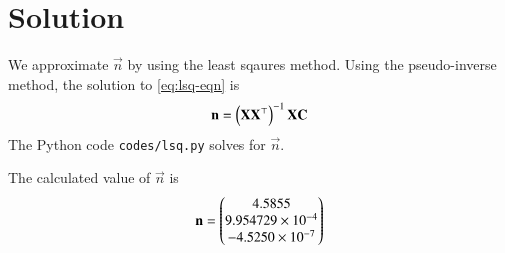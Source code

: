 \documentclass[journal,12pt,twocolumn]{IEEEtran}
\begin{document}
\section{Solution}
We approximate $\vec{n}$ by using the least sqaures method. 
Using the pseudo-inverse method, the solution to \eqref{eq:lsq-eqn} 
is
\begin{align}
    \boldsymbol{\mathbf{n}} = \left(\boldsymbol{\mathbf{XX}}^\top\right)^{-1}\boldsymbol{\mathbf{X}}\boldsymbol{\mathbf{C}}
\end{align}
The Python code \texttt{codes/lsq.py} solves for $\vec{n}$.

The calculated value of $\vec{n}$ is
\begin{align}
    \boldsymbol{\mathbf{n}} = \begin{pmatrix}4.5855\\9.954729\times10^{-4}\\-4.5250\times10^{-7}\end{pmatrix}
    \label{eq:opt-theta}
\end{align}

%
\end{document}
